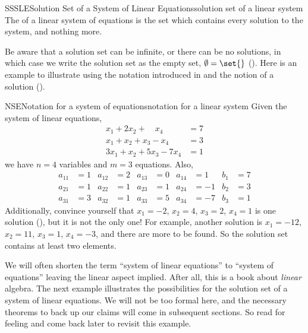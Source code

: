 %
\begin{definition}{SSSLE}{Solution Set of a System of Linear Equations}{solution set of a linear system}
The  of a linear system of equations is the set which contains every solution to the system, and nothing more.
\end{definition}
%
Be aware that a solution set can be infinite, or there can be no solutions, in which case we write the solution set as the empty set, $\emptyset=\set{}$ ().  Here is an example to illustrate using the notation introduced in  and the notion of a solution ().
%
\begin{example}{NSE}{Notation for a system of equations}{notation for a linear system}
Given the system of linear equations,
%
\begin{align*}
x_1+2x_2 +\quad x_4&= 7\\
x_1+x_2+x_3-x_4&=3\\
3x_1+x_2+5x_3-7x_4&=1
\end{align*}
%
we have $n=4$ variables and $m=3$ equations.  Also,
%
\begin{align*}
a_{11}&=1 & a_{12}&=2 & a_{13}&=0 & a_{14}&=1 & b_{1}&=7\\
a_{21}&=1 & a_{22}&=1 & a_{23}&=1 & a_{24}&=-1 & b_{2}&=3\\
a_{31}&=3 & a_{32}&=1 & a_{33}&=5 & a_{34}&=-7 & b_{3}&=1
\end{align*}
%
Additionally, convince yourself that $x_{1}=-2$, $x_{2}=4$, $x_{3}=2$, $x_{4}=1$ is one solution (), but it is not the only one!  For example, another solution is $x_{1}=-12$, $x_{2}=11$, $x_{3}=1$, $x_{4}=-3$, and there are more to be found.  So the solution set contains at least two elements.
\end{example}
%
We will often shorten the term  ``system of linear equations'' to ``system of equations'' leaving the linear aspect implied.  After all, this is a book about {\em linear} algebra.
%
The next example illustrates the possibilities for the solution set of a system of linear equations.  We will not be too formal here, and the necessary theorems to back up our claims will come in subsequent sections.  So read for feeling and come back later to revisit this example.
%
